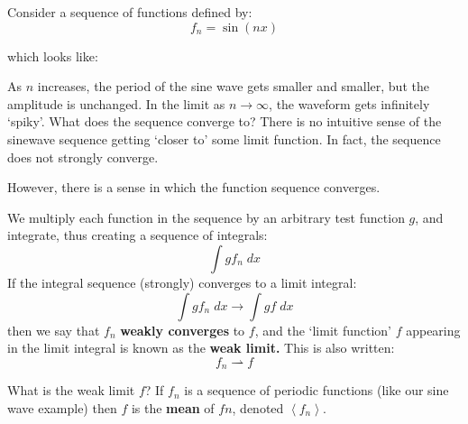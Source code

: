 \documentclass[a4paper]{report}
\begin{document}
Consider a sequence of functions defined by:
\begin{equation}
f_n = \sin(n x)
\end{equation}

which looks like:
\begin{center}
\end{center}

As $n$ increases, the period of the sine wave gets smaller and smaller, but the amplitude is unchanged.  In the limit as $n \to \infty$, the waveform gets infinitely `spiky'.  What does the sequence converge to?  There is no intuitive sense of the sinewave sequence getting `closer to' some limit function.  In fact, the sequence does not strongly converge.

However, there is a sense in which the function sequence converges. 

We multiply each function in the sequence by an arbitrary test function $g$, and integrate, thus creating a sequence of integrals:
\begin{equation}
\int g f_n \;dx
\end{equation}
If the integral sequence (strongly) converges to a limit integral:
\begin{equation}
\int g f_n \;dx \to \int g f \;dx
\end{equation}
then we say that $f_n$ \textbf{weakly converges} to $f$, and the `limit function' $f$ appearing in the limit integral is known as the \textbf{weak limit.}  This is also written:
\begin{equation}
f_n \rightharpoonup f
\end{equation}

What is the weak limit $f$?  If $f_n$ is a sequence of periodic functions (like our sine wave example) then $f$ is the \textbf{mean} of $fn$, denoted $\left< f_n \right>  $.
\end{document}
